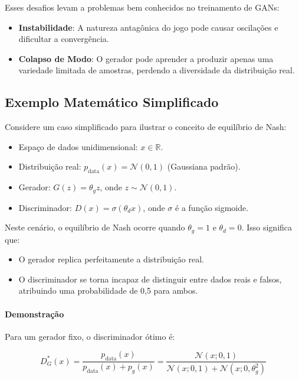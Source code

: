 \documentclass[a4paper]{tufte-handout}
\begin{document}
Esses desafios levam a problemas bem conhecidos no treinamento de GANs:

\begin{itemize}
    \item \textbf{Instabilidade}: A natureza antagônica do jogo pode causar oscilações e dificultar a convergência.
    \item \textbf{Colapso de Modo}: O gerador pode aprender a produzir apenas uma variedade limitada de amostras, perdendo a diversidade da distribuição real.
\end{itemize}

\subsection{Exemplo Matemático Simplificado}

Considere um caso simplificado para ilustrar o conceito de equilíbrio de Nash:

\begin{itemize}
    \item Espaço de dados unidimensional: $x \in \mathbb{R}$.
    \item Distribuição real: $p_{\text{data}}(x) = \mathcal{N}(0, 1)$ (Gaussiana padrão).
    \item Gerador: $G(z) = \theta_g z$, onde $z \sim \mathcal{N}(0, 1)$.
    \item Discriminador: $D(x) = \sigma(\theta_d x)$, onde $\sigma$ é a função sigmoide.
\end{itemize}

Neste cenário, o equilíbrio de Nash ocorre quando $\theta_g = 1$ e $\theta_d = 0$. Isso significa que:
\begin{itemize}
    \item O gerador replica perfeitamente a distribuição real.
    \item O discriminador se torna incapaz de distinguir entre dados reais e falsos, atribuindo uma probabilidade de 0,5 para ambos.
\end{itemize}

\paragraph{Demonstração}

Para um gerador fixo, o discriminador ótimo é:

\begin{equation*}
D^*_G(x) = \frac{p_{\text{data}}(x)}{p_{\text{data}}(x) + p_g(x)} = \frac{\mathcal{N}(x; 0, 1)}{\mathcal{N}(x; 0, 1) + \mathcal{N}(x; 0, \theta_g^2)}
\end{equation*}
\end{document}
